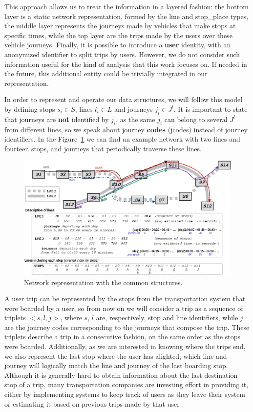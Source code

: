 	This approach allows us to treat the information in a layered fashion: the bottom layer is a static network representation, formed by the line and stop\_place types, the middle layer represents the journeys made by vehicles that make stops at specific times, while the top layer are the trips made by the users over these vehicle journeys. Finally, it is possible to introduce a \textbf{user} identity, with an anonymized identifier to split trips by users. However, we do not consider such information useful for the kind of analysis that this work focuses on. If needed in the future, this additional entity could be trivially integrated in our representation.
	
	In order to represent and operate our data structures, we will follow this model by defining stops $s_i \in S$, lines $l_i \in L$ and journeys $j_i \in J^l$. It is important to state that journeys are \textbf{not} identified by $j_i$, as the same $j_i$ can belong to several $J^l$ from different lines, so we speak about journey \textbf{codes} (jcodes) instead of journey identifiers. In the Figure~\ref{fig:example_trips_ttctr} we can find an example network with two lines and fourteen stops, and journeys that periodically traverse these lines.
	
    \begin{figure}[ht]
        \includegraphics[width=\textwidth]{figures/network.eps}
        \caption{Network representation with the common structures.}
        \label{fig:example_trips_ttctr}
    \end{figure}
    
    A user trip can be represented by the stops from the transportation system that were boarded by a user, so from now on we will consider a trip as a sequence of triplets $<s,l,j>$, where $s$, $l$ are, respectively, stop and line identifiers, while $j$ are the journey codes corresponding to the journeys that compose the trip. These triplets describe a trip in a consecutive fashion, on the same order as the stops were boarded. Additionally, as we are interested in knowing where the trips end, we also represent the last stop where the user has alighted, which line and journey will logically match the line and journey of the last boarding stop. Although it is generally hard to obtain information about the last destination stop of a trip, many transportation companies are investing effort in providing it, either by implementing systems to keep track of users as they leave their system or estimating it based on previous trips made by that user \cite{alsger2016validating}.
    
